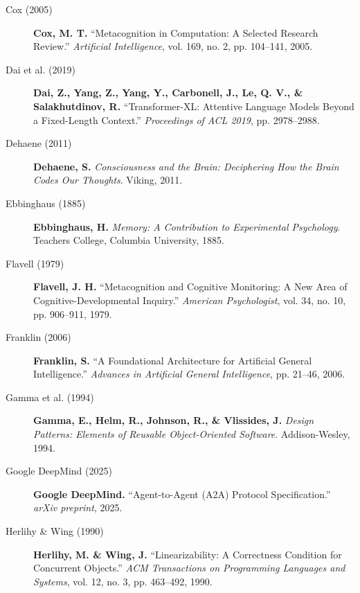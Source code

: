 \begin{description}
    \item[Cox (2005)] \textbf{Cox, M. T.} ``Metacognition in Computation: A Selected Research Review.'' \textit{Artificial Intelligence}, vol. 169, no. 2, pp. 104--141, 2005. 
    
    \item[Dai et al. (2019)] \textbf{Dai, Z., Yang, Z., Yang, Y., Carbonell, J., Le, Q. V., \& Salakhutdinov, R.} ``Transformer-XL: Attentive Language Models Beyond a Fixed-Length Context.'' \textit{Proceedings of ACL 2019}, pp. 2978--2988. 
    
    \item[Dehaene (2011)] \textbf{Dehaene, S.} \textit{Consciousness and the Brain: Deciphering How the Brain Codes Our Thoughts}. Viking, 2011. 
    
    \item[Ebbinghaus (1885)] \textbf{Ebbinghaus, H.} \textit{Memory: A Contribution to Experimental Psychology}. Teachers College, Columbia University, 1885. 
    
    \item[Flavell (1979)] \textbf{Flavell, J. H.} ``Metacognition and Cognitive Monitoring: A New Area of Cognitive-Developmental Inquiry.'' \textit{American Psychologist}, vol. 34, no. 10, pp. 906--911, 1979. 
    
    \item[Franklin (2006)] \textbf{Franklin, S.} ``A Foundational Architecture for Artificial General Intelligence.'' \textit{Advances in Artificial General Intelligence}, pp. 21--46, 2006. 
    
    \item[Gamma et al. (1994)] \textbf{Gamma, E., Helm, R., Johnson, R., \& Vlissides, J.} \textit{Design Patterns: Elements of Reusable Object-Oriented Software}. Addison-Wesley, 1994. 
    
    \item[Google DeepMind (2025)] \textbf{Google DeepMind.} ``Agent-to-Agent (A2A) Protocol Specification.'' \textit{arXiv preprint}, 2025. 

    \item[Herlihy \& Wing (1990)] \textbf{Herlihy, M. \& Wing, J.} ``Linearizability: A Correctness Condition for Concurrent Objects.'' \textit{ACM Transactions on Programming Languages and Systems}, vol. 12, no. 3, pp. 463--492, 1990. 
    

\end{description}
